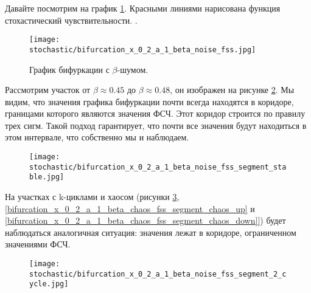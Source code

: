 
        Давайте посмотрим на график \ref{bifurcation_x_0_2_a_1_beta_chaos_fss}. Красными линиями нарисована функция стохастический чувствительности. . 

        \begin{figure}
            \centering
            \texttt{[image: stochastic/bifurcation\_x\_0\_2\_a\_1\_beta\_noise\_fss.jpg]}
        
            \captionsetup{justification=centering}
            \caption{График бифуркации с \(\beta\)-шумом.}
            \label{bifurcation_x_0_2_a_1_beta_chaos_fss}
        \end{figure}

        Рассмотрим участок от \(\beta \approx 0.45\) до \(\beta \approx 0.48\), он изображен на рисунке \ref{bifurcation_x_0_2_a_1_beta_chaos_fss_segment_stable}. Мы видим, что значения графика бифуркации почти всегда находятся в коридоре, границами которого являются значения ФСЧ. Этот коридор строится по правилу трех сигм. Такой подход гарантирует, что почти все значения будут находиться в этом интервале, что собственно мы и наблюдаем.

        \begin{figure}
            \centering
            \texttt{[image: stochastic/bifurcation\_x\_0\_2\_a\_1\_beta\_noise\_fss\_segment\_stable.jpg]}
        
            \captionsetup{justification=centering}
            \caption{}
            \label{bifurcation_x_0_2_a_1_beta_chaos_fss_segment_stable}
        \end{figure}

        На участках с k-циклами и хаосом (рисунки \ref{bifurcation_x_0_2_a_1_beta_chaos_fss_segment_2_cycle}, \ref{bifurcation_x_0_2_a_1_beta_chaos_fss_segment_chaos_up} и \ref{bifurcation_x_0_2_a_1_beta_chaos_fss_segment_chaos_down]}) будет наблюдаться аналогичная ситуация: значения лежат в коридоре, ограниченном значениями ФСЧ.

        \begin{figure}
            \centering
            \texttt{[image: stochastic/bifurcation\_x\_0\_2\_a\_1\_beta\_noise\_fss\_segment\_2\_cycle.jpg]}
        
            \captionsetup{justification=centering}
            \caption{}
            \label{bifurcation_x_0_2_a_1_beta_chaos_fss_segment_2_cycle}
        \end{figure}

